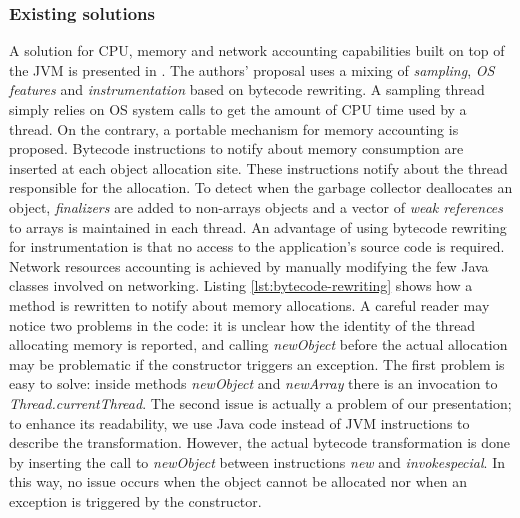 \subsubsection*{Existing solutions}
A solution for CPU, memory and network accounting capabilities built on top of the JVM is presented in \cite{czajkowski_jres:_1998}.
The authors' proposal uses a mixing of \textit{sampling}, \textit{OS features} and \textit{instrumentation} based on bytecode rewriting.
A sampling thread simply relies on OS system calls to get the amount of CPU time used by a thread.
On the contrary, a portable mechanism for memory accounting is proposed.
Bytecode instructions to notify about memory consumption are inserted at each object allocation site.
These instructions notify about the thread responsible for the allocation.
To detect when the garbage collector deallocates an object, \textit{finalizers} are added to non-arrays objects and a vector of \textit{weak references} to arrays is maintained in each thread.
An advantage of using bytecode rewriting for instrumentation is that no access to the application's source code is required.
Network resources accounting is achieved by manually modifying the few Java classes involved on networking.
Listing \ref{lst:bytecode-rewriting} shows how a method is rewritten to notify about memory allocations. 
A careful reader may notice two problems in the code: it is unclear how the identity of the thread allocating memory is reported, and calling \textit{newObject} before the actual allocation may be problematic if the constructor triggers an exception.
The first problem is easy to solve: inside methods \textit{newObject} and \textit{newArray} there is an invocation to \textit{Thread.currentThread}.
The second issue is actually a problem of our presentation; to enhance its readability, we use Java code instead of JVM instructions to describe the transformation.
However, the actual bytecode transformation is done by inserting the call to \textit{newObject} between instructions \textit{new} and \textit{invokespecial}.
In this way, no issue occurs when the object cannot be allocated nor when an exception is triggered by the constructor.

\begin{lstlisting}
\end{lstlisting}


